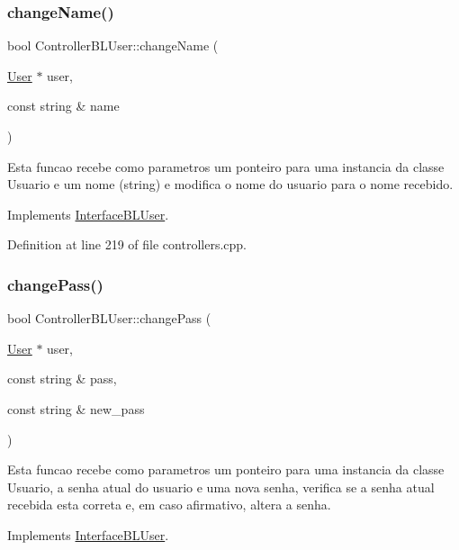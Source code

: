 \subsubsection{\texorpdfstring{change\+Name()}{changeName()}}
{\footnotesize\ttfamily bool Controller\+B\+L\+User\+::change\+Name (\begin{DoxyParamCaption}\item[{\hyperlink{class_user}{User} $\ast$}]{user,  }\item[{const string \&}]{name }\end{DoxyParamCaption})\hspace{0.3cm}{\ttfamily [virtual]}}

Esta funcao recebe como parametros um ponteiro para uma instancia da classe Usuario e um nome (string) e modifica o nome do usuario para o nome recebido. 

Implements \hyperlink{class_interface_b_l_user_a6bb394145d7e0f97902dcc2570919bb0}{Interface\+B\+L\+User}.



Definition at line 219 of file controllers.\+cpp.

\mbox{\label{class_controller_b_l_user_a90ac2cdd863f28b57b6e7d27ff4ede0c}} 
\subsubsection{\texorpdfstring{change\+Pass()}{changePass()}}
{\footnotesize\ttfamily bool Controller\+B\+L\+User\+::change\+Pass (\begin{DoxyParamCaption}\item[{\hyperlink{class_user}{User} $\ast$}]{user,  }\item[{const string \&}]{pass,  }\item[{const string \&}]{new\+\_\+pass }\end{DoxyParamCaption})\hspace{0.3cm}{\ttfamily [virtual]}}

Esta funcao recebe como parametros um ponteiro para uma instancia da classe Usuario, a senha atual do usuario e uma nova senha, verifica se a senha atual recebida esta correta e, em caso afirmativo, altera a senha. 

Implements \hyperlink{class_interface_b_l_user_a1d683de35fc2d6e65379add3f0a42b61}{Interface\+B\+L\+User}.



